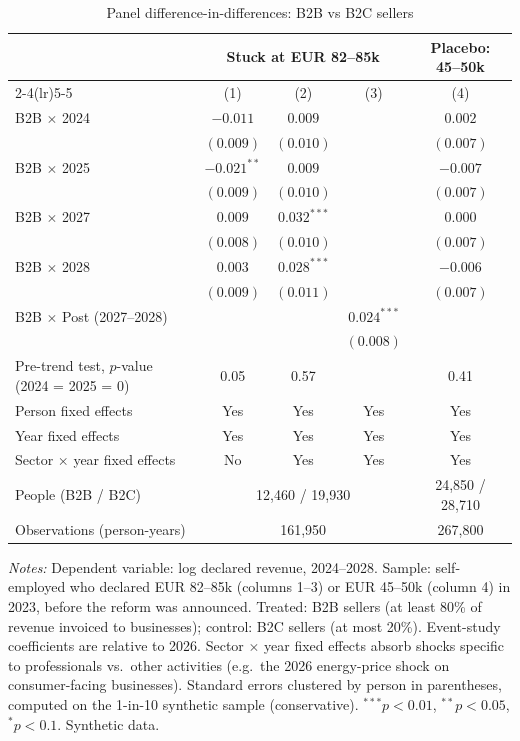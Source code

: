 \begin{table}[t]
\centering
\begin{threeparttable}
\caption{Panel difference-in-differences: B2B vs B2C sellers}
\label{tab:did}
\small\setlength{\tabcolsep}{5pt}
\begin{tabular}{lcccc}
\toprule
 & \multicolumn{3}{c}{Stuck at EUR 82--85k} & Placebo: 45--50k \\
\cmidrule(lr){2-4}\cmidrule(lr){5-5}
 & (1) & (2) & (3) & (4) \\
\midrule
B2B $\times$ 2024 & $-0.011$ & $0.009$ &  & $0.002$ \\
 & $(0.009)$ & $(0.010)$ &  & $(0.007)$ \\[2pt]
B2B $\times$ 2025 & $-0.021^{**}$ & $0.009$ &  & $-0.007$ \\
 & $(0.009)$ & $(0.010)$ &  & $(0.007)$ \\[2pt]
B2B $\times$ 2027 & $0.009$ & $0.032^{***}$ &  & $0.000$ \\
 & $(0.008)$ & $(0.010)$ &  & $(0.007)$ \\[2pt]
B2B $\times$ 2028 & $0.003$ & $0.028^{***}$ &  & $-0.006$ \\
 & $(0.009)$ & $(0.011)$ &  & $(0.007)$ \\[2pt]
B2B $\times$ Post (2027--2028) &  &  & $0.024^{***}$ &  \\
 &  &  & $(0.008)$ &  \\[2pt]
\midrule
Pre-trend test, $p$-value (2024 = 2025 = 0) & 0.05 & 0.57 & & 0.41 \\
Person fixed effects & Yes & Yes & Yes & Yes \\
Year fixed effects & Yes & Yes & Yes & Yes \\
Sector $\times$ year fixed effects & No & Yes & Yes & Yes \\
People (B2B / B2C) & \multicolumn{3}{c}{12,460 / 19,930} & 24,850 / 28,710 \\
Observations (person-years) & \multicolumn{3}{c}{161,950} & 267,800 \\
\bottomrule
\end{tabular}
\begin{tablenotes}[flushleft]\footnotesize
\item \textit{Notes:} Dependent variable: log declared revenue, 2024--2028. Sample: self-employed who declared
EUR 82--85k (columns 1--3) or EUR 45--50k (column 4) in 2023, before the reform was announced. Treated: B2B sellers
(at least 80\% of revenue invoiced to businesses); control: B2C sellers (at most 20\%). Event-study coefficients are
relative to 2026. Sector $\times$ year fixed effects absorb shocks specific to professionals vs.\ other activities
(e.g.\ the 2026 energy-price shock on consumer-facing businesses). Standard errors clustered by person in parentheses,
computed on the 1-in-10 synthetic sample (conservative). $^{***}p<0.01$, $^{**}p<0.05$, $^{*}p<0.1$. Synthetic data.
\end{tablenotes}
\end{threeparttable}
\end{table}

